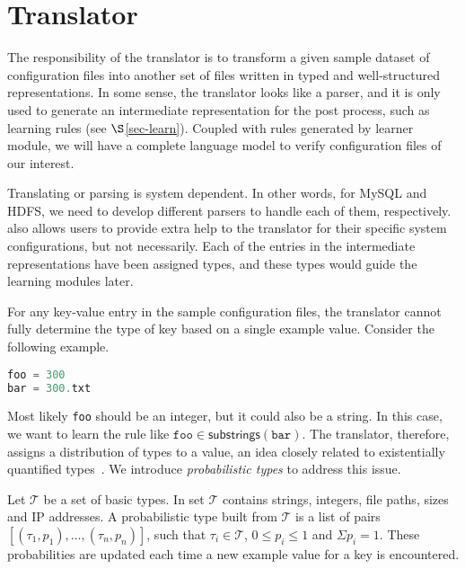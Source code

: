 
\section{Translator}
\label{sec-trans}

The responsibility of the translator is to transform a given sample
dataset of configuration files into another set of files written in
typed and well-structured representations.
In some sense, the translator looks like a parser, and it is only
used to generate an intermediate representation for the post
process, such as learning rules (see $\S$\ref{sec-learn}).
Coupled with rules generated by learner module,
we will have a complete language model to verify configuration files
of our interest.

Translating or parsing is system dependent. In other words, for MySQL
and HDFS, we need to develop different parsers to handle each of them,
respectively. \app also allows users to 
provide extra help to the translator
for their specific system configurations,
but not necessarily. 
Each of the entries in the intermediate representations
have been assigned types, and these types would guide the learning
modules later.


For any key-value entry in the sample configuration files,
the translator cannot fully determine the type of key 
based on a single example value.
Consider the following example.

\begin{lstlisting}[language=C, xleftmargin=.01\textwidth]
foo = 300
bar = 300.txt
\end{lstlisting} 

Most likely {\tt foo} should be an integer, but it could also be a string.
In this case, we want to learn the rule like 
$ \texttt{foo} \in \textsf{substrings}(\texttt{bar})$. 
The translator, therefore, assigns a distribution of types 
to a value, an idea closely related to existentially quantified 
types~\cite{Launchbury93lazyfunctional}. 
We introduce {\em probabilistic types} to address this issue.

Let $\mathcal{T}$ be a set of basic types. 
In \app set $\mathcal{T}$ contains strings, integers, file paths, 
sizes and IP addresses. 
A probabilistic type built from $\mathcal{T}$ is a list of pairs 
$[(\tau_1, p_1),\ldots,(\tau_n, p_n)]$,
such that $\tau_i \in \mathcal{T}$, $0 \le p_i \le 1$ 
and $\Sigma p_i = 1$. 
These probabilities are updated each time a new example value 
for a key is encountered.

